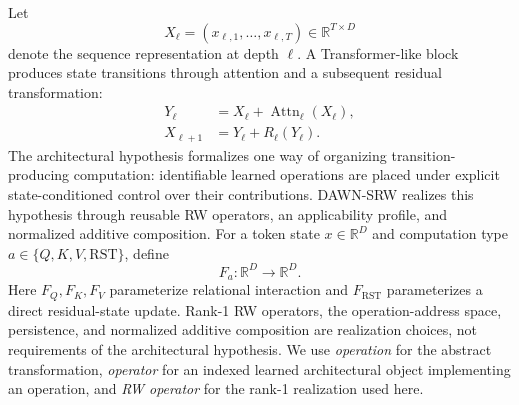 \documentclass{article}
\newcommand{\R}{\mathbb{R}}
\newcommand{\DAWN}{DAWN-SRW}
\begin{document}
Let
\[
X_\ell=(x_{\ell,1},\ldots,x_{\ell,T})\in\R^{T\times D}
\]
denote the sequence representation at depth \(\ell\). A Transformer-like block
produces state transitions through attention and a subsequent residual transformation:
\begin{align}
Y_\ell&=X_\ell+\operatorname{Attn}_\ell(X_\ell),\\
X_{\ell+1}&=Y_\ell+R_\ell(Y_\ell).
\label{eq:state_transitions}
\end{align}
The architectural hypothesis formalizes one way of organizing
transition-producing computation: identifiable learned operations are placed
under explicit state-conditioned control over their contributions. \DAWN{}
realizes this hypothesis through reusable RW operators, an applicability
profile, and normalized additive composition. For a token state
\(x\in\R^D\) and computation type
\(a\in\{Q,K,V,\mathrm{RST}\}\), define
\begin{equation}
F_a:\R^D\rightarrow\R^D.
\label{eq:composed_output}
\end{equation}
Here \(F_Q,F_K,F_V\) parameterize relational interaction and
\(F_{\mathrm{RST}}\) parameterizes a direct residual-state update. Rank-1 RW
operators, the operation-address space, persistence, and normalized additive
composition are realization choices, not requirements of the architectural
hypothesis. We
use \emph{operation} for the abstract transformation, \emph{operator} for an
indexed learned architectural object implementing an operation, and \emph{RW
operator} for the rank-1 realization used here.
\end{document}
